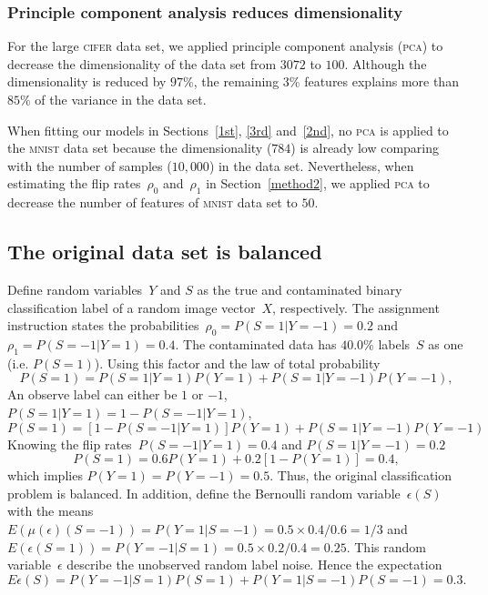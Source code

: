 \documentclass[12pt]{article} %
\begin{document}
\subsubsection{Principle component analysis reduces dimensionality}
For the large \textsc{cifer} data set, we applied principle component analysis (\textsc{pca}) to decrease the dimensionality of the data set from $3072$ to $100$. Although the dimensionality is reduced by $97\%$, the remaining $3\%$ features explains more than $85\%$ of the variance in the data set. 

When fitting our models in Sections~\ref{1st}, \ref{3rd} and~\ref{2nd}, no \textsc{pca} is applied to the \textsc{mnist} data set because the dimensionality ($784$) is already low comparing with the number of samples ($10,000$) in the data set. Nevertheless, when estimating the flip rates~$\rho_0$ and~$\rho_1$ in Section~\ref{method2}, we applied \textsc{pca} to decrease the number of features of \textsc{mnist} data set to $50$.

\subsection{The original data set is balanced} \label{sec:1}
Define random variables~$Y$ and $S$ as the true and contaminated binary classification label of a random image vector~$X$, respectively. The assignment instruction states the probabilities~$\rho_0=P(S=1|Y=-1)=0.2$ and $\rho_1=P(S=-1|Y=1)=0.4$.
The contaminated data has $40.0\%$ labels~$S$ as one (i.e. $P(S=1)$). Using this factor and the law of total probability
\begin{equation*}
P(S=1)=P(S=1|Y=1)P(Y=1)+P(S=1|Y=-1)P(Y=-1),
\end{equation*}
An observe label can either be $1$ or $-1$, $P(S=1|Y=1)=1-P(S=-1|Y=1)$,
\begin{equation*}
P(S=1)=\left[1-P(S=-1|Y=1)\right]P(Y=1)+P(S=1|Y=-1)P(Y=-1)
\end{equation*}
Knowing the flip rates~$P(S=-1|Y=1)=0.4$ and $P(S=1|Y=-1)=0.2$
\begin{equation}
P(S=1)=0.6P(Y=1)+0.2\left[1-P(Y=1)\right]=0.4, \label{eq:ps}
\end{equation}
which implies $P(Y=1)=P(Y=-1)=0.5$. Thus, the original classification problem is balanced. 
In addition, define the Bernoulli random variable~$\epsilon(S)$ with the means $E(\mu(\epsilon)(S=-1))=P(Y=1|S=-1)=0.5\times0.4/0.6=1/3$ and $E(\epsilon(S=1))=P(Y=-1|S=1)=0.5\times0.2/0.4=0.25$. This random variable~$\epsilon$ describe the unobserved random label noise. Hence the expectation
\begin{equation}
    E\epsilon(S)=P(Y=-1|S=1)P(S=1)+P(Y=1|S=-1)P(S=-1)
    =0.3.\label{eq:exp}
\end{equation}
\end{document}
